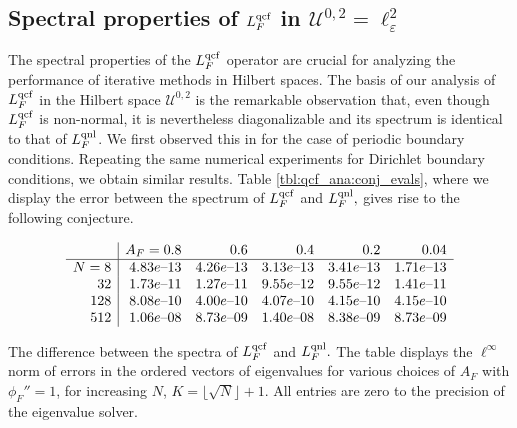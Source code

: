 \documentclass[12pt,reqno]{amsart}
\newcounter{remark}
\begin{document}
\subsection{Spectral properties of ${L^{{\rm qcf}}_F}$ in ${\mathcal{U}}^{0,2}=\ell^2_{\varepsilon}$}
\label{sec:qcf:U02}
The spectral properties of the ${L^{{\rm qcf}}_F}$ operator are crucial for
analyzing the performance of iterative methods in Hilbert spaces.  The
basis of our analysis of ${L^{{\rm qcf}}_F}$ in the Hilbert space ${\mathcal{U}}^{0,2}$ is
the remarkable observation that, even though ${L^{{\rm qcf}}_F}$ is non-normal, it
is nevertheless diagonalizable and its spectrum is identical to that
of ${L^{{\rm qnl}}_F}$. We first observed this in
\cite[Section~4.4]{sharpstabilityqcf} for the case of periodic
boundary conditions.  Repeating the same numerical experiments for
Dirichlet boundary conditions, we obtain similar results. Table
\ref{tbl:qcf_ana:conj_evals}, where we display the error between the
spectrum of ${L^{{\rm qcf}}_F}$ and ${L^{{\rm qnl}}_F},$ gives rise to the following
conjecture.

\begin{table}[t]
  \begin{equation*}
\begin{array}{r|rrrrr}
      &       A_F = 0.8 &       0.6 &       0.4 &       0.2 &      0.04 \\
\hline
     N = 8 &  4.83e\hbox{--}13 &  4.26e\hbox{--}13 &  3.13e\hbox{--}13 &  3.41e\hbox{--}13 &  1.71e\hbox{--}13 \\
    32 &  1.73e\hbox{--}11 &  1.27e\hbox{--}11 &  9.55e\hbox{--}12 &  9.55e\hbox{--}12 &  1.41e\hbox{--}11 \\
   128 &  8.08e\hbox{--}10 &  4.00e\hbox{--}10 &  4.07e\hbox{--}10 &  4.15e\hbox{--}10 &  4.15e\hbox{--}10 \\
   512 &  1.06e\hbox{--}08 &  8.73e\hbox{--}09 &  1.40e\hbox{--}08 &  8.38e\hbox{--}09 &  8.73e\hbox{--}09 \\
\end{array}
  \end{equation*}
    \caption{\label{tbl:qcf_ana:conj_evals} The difference between the
    spectra of ${L^{{\rm qcf}}_F}$ and
    ${L^{{\rm qnl}}_F}.$ The table displays the $\ell^\infty$ norm of errors in the
    ordered vectors of eigenvalues for various choices of $A_F$ with $\phi_F'' = 1$, for increasing
    $N$, $K = \lfloor\sqrt{N}\rfloor + 1$.  All entries are zero to the
    precision of the eigenvalue solver.  }
  \vspace{-7mm}
\end{table}
\end{document}
